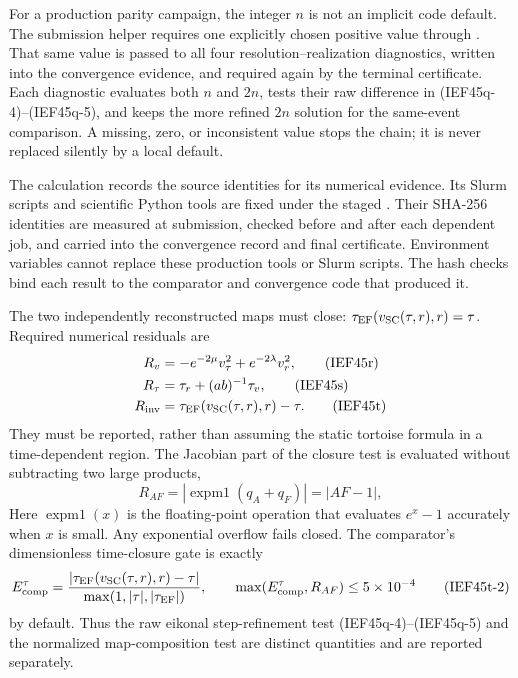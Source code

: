 For a production parity campaign, the integer \(n\) is not an implicit code
default.  The submission helper requires one explicitly chosen positive value
through .  That same value is passed to all four
resolution--realization diagnostics, written into the convergence evidence,
and required again by the terminal certificate.  Each diagnostic evaluates
both \(n\) and \(2n\), tests their raw difference in
(IEF45q-4)--(IEF45q-5), and keeps the more refined \(2n\) solution for the
same-event comparison.  A missing, zero, or inconsistent value stops the
chain; it is never replaced silently by a local default.

The calculation records the source identities for its numerical evidence.  Its Slurm
scripts and scientific Python tools are fixed under the staged
.  Their SHA-256 identities are measured at
submission, checked before and after each dependent job, and carried into the
convergence record and final certificate.  Environment variables cannot
replace these production tools or Slurm scripts.  The hash checks bind each result to the comparator and convergence code
that produced it.

The two independently reconstructed maps must close:
\(\tau_{\rm EF}(v_{\rm SC}(\tau,r),r)=\tau\).  Required numerical residuals
are
\begin{align}
 R_v&=-e^{-2\mu}v_\tau^2+e^{-2\lambda}v_r^2,           \tag{IEF45r}\\
 R_\tau&=\tau_r+(ab)^{-1}\tau_v,                       \tag{IEF45s}\\
 R_{\rm inv}&=\tau_{\rm EF}(v_{\rm SC}(\tau,r),r)-\tau.\tag{IEF45t}
\end{align}
They must be reported, rather than assuming the static tortoise formula in a
time-dependent region.
The Jacobian part of the closure test is evaluated without subtracting two
large products,
\[
R_{AF}=\left|\operatorname{expm1}(q_A+q_F)\right|
       =|AF-1|,                                        \tag{IEF45t-1}
\]
Here \(\operatorname{expm1}(x)\) is the floating-point operation that
evaluates \(e^x-1\) accurately when \(x\) is small.
Any exponential overflow fails closed.  The comparator's dimensionless
time-closure gate is exactly
\[
 E_{\rm comp}^{\tau}
 =\frac{|\tau_{\rm EF}(v_{\rm SC}(\tau,r),r)-\tau|}
        {\max(1,|\tau|,|\tau_{\rm EF}|)},
 \qquad
 \max(E_{\rm comp}^{\tau},R_{AF})\le5\times10^{-4}    \tag{IEF45t-2}
\]
by default.  Thus the raw eikonal step-refinement test
(IEF45q-4)--(IEF45q-5) and the normalized map-composition test are distinct
quantities and are reported separately.

